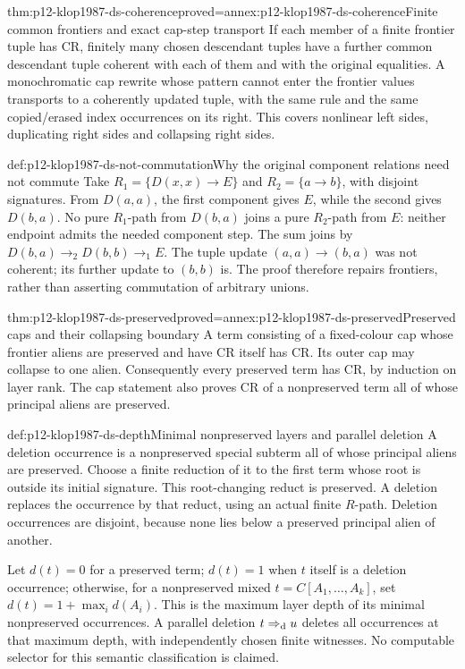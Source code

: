 \begin{hblemma}{thm:p12-klop1987-ds-coherence}{proved=annex:p12-klop1987-ds-coherence}{Finite common frontiers and exact cap-step transport}
If each member of a finite frontier tuple has CR, finitely many
chosen descendant tuples have a further common descendant tuple
coherent with each of them and with the original equalities.
A monochromatic cap rewrite whose pattern cannot enter the frontier
values transports to a coherently updated tuple, with the same
rule and the same copied/erased index occurrences on its right.
This covers nonlinear left sides, duplicating right sides and
collapsing right sides.
\end{hblemma}

\begin{hbexample}{def:p12-klop1987-ds-not-commutation}{Why the original component relations need not commute}
Take \(R_1=\{D(x,x)\to E\}\) and \(R_2=\{a\to b\}\),
with disjoint signatures. From \(D(a,a)\), the first component
gives \(E\), while the second gives \(D(b,a)\). No pure
\(R_1\)-path from \(D(b,a)\) joins a pure \(R_2\)-path
from \(E\): neither endpoint admits the needed component step.
The sum joins by \(D(b,a)\to_2D(b,b)\to_1E\).
The tuple update \((a,a)\to(b,a)\) was not coherent; its
further update to \((b,b)\) is. The proof therefore repairs
frontiers, rather than asserting commutation of arbitrary unions.
\end{hbexample}

\begin{hblemma}{thm:p12-klop1987-ds-preserved}{proved=annex:p12-klop1987-ds-preserved}{Preserved caps and their collapsing boundary}
A term consisting of a fixed-colour cap whose frontier aliens are
preserved and have CR itself has CR. Its outer cap may collapse
to one alien. Consequently every preserved term has CR, by
induction on layer rank. The cap statement also proves CR of a
nonpreserved term all of whose principal aliens are preserved.
\end{hblemma}

\begin{hbdefinition}{def:p12-klop1987-ds-depth}{Minimal nonpreserved layers and parallel deletion}
A deletion occurrence is a nonpreserved special subterm all of
whose principal aliens are preserved. Choose a finite reduction
of it to the first term whose root is outside its initial signature.
This root-changing reduct is preserved. A deletion replaces the
occurrence by that reduct, using an actual finite \(R\)-path.
Deletion occurrences are disjoint, because none lies below a
preserved principal alien of another.

Let \(d(t)=0\) for a preserved term; \(d(t)=1\) when \(t\)
itself is a deletion occurrence; otherwise, for a nonpreserved
mixed \(t=C[A_1,\ldots,A_k]\), set
\(d(t)=1+\max_i d(A_i)\). This is the maximum layer depth
of its minimal nonpreserved occurrences. A parallel deletion
\(t\Rightarrow_{\rm d}u\) deletes all occurrences at that
maximum depth, with independently chosen finite witnesses.
No computable selector for this semantic classification is claimed.
\end{hbdefinition}

